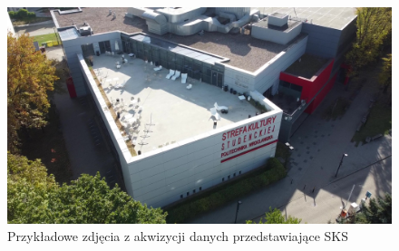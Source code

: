 \begin{figure}[h!]
\begin{minipage}{0.24\textwidth}
    \end{minipage}
    \hfill
    \begin{minipage}{0.24\textwidth}
        \centering
        \includegraphics[width=\textwidth]{img/sks_dataset_4.jpg}
    \end{minipage}
    \caption{Przykładowe zdjęcia z akwizycji danych przedstawiające SKS}
    \label{fig:four-photos}
\end{figure}